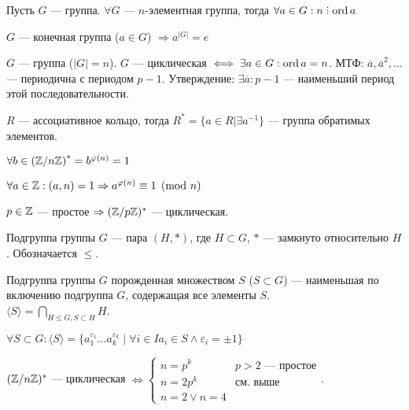 \begin{theorem}
    Пусть $G$ --- группа.  $\forall G$ ---  $n$-элементная группа, тогда  $\forall a \in G: n \divby \ord a$
\end{theorem}
\begin{consequence}
    $G$ --- конечная группа ($a \in G$) $\Rightarrow a^{|G|} = e$
\end{consequence}
\begin{statement}
    $G$ --- группа ($|G|=n$). $G$ --- циклическая  $\iff \exists a \in G: \operatorname{ord} a = n$.  
    МТФ: $\overline{a}, \overline{a}^2,\ldots$ --- периодична с периодом $p-1$. Утверждение:  $\exists \overline{a}: p-1$ --- наименьший период этой последовательности.
\end{statement}
\begin{definition}
    $R$ --- ассоциативное кольцо, тогда  $R^* = \{a \in R | \exists a^{-1}\}$ --- группа обратимых элементов.
\end{definition}
 \begin{theorem}
     $\forall b \in \left(\mathbb{Z} / n\mathbb{Z}\right)^* = b^{\varphi(n)} = 1$
\end{theorem}
\begin{theorem}
    $\forall a \in \mathbb{Z}: (a, n) = 1 \Rightarrow a^{\varphi(n)} \equiv 1 \pmod{n}$ 
\end{theorem}
 \begin{theorem}
     $p \in \mathbb{Z}$ --- простое  $\Rightarrow (\mathbb{Z} / p\mathbb{Z})^*$ --- циклическая.
 \end{theorem}
 \begin{definition}
     Подгруппа группы $G$ --- пара  $(H, \ast)$, где  $H \subset G$,  $\ast$ --- замкнуто относительно $H$. Обозначается $\le$.
 \end{definition}
 \begin{definition}
     Подгруппа группы $G$ порожденная множеством  $S$  ($S \subset G$) --- наименьшая по включению подгруппа $G$, содержащая все элементы  $S$.\\
     $\langle S \rangle = \displaystyle \bigcap_{H \le G, S \subset H} H$.\\
 \end{definition}
 \begin{theorem}
     $\forall S \subset G\!: \langle S \rangle= \{a_1^{\varepsilon_1} \ldots a_k^{\varepsilon_k} \mid \forall i \in I a_i \in S \land \varepsilon_i = \pm 1\}$
 \end{theorem}
  \begin{theorem}
      $(\mathbb{Z} / n\mathbb{Z})^*$ --- циклическая  $\iff \begin{cases} n=p^k & p>2\text{ --- простое} \\ n = 2 p^k & \text{см. выше} \\ n = 2 \lor n = 4\end{cases}$.
 \end{theorem}
